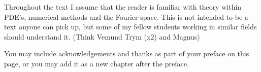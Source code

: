 
Throughout the text I assume that the reader is familiar with theory within PDE’s, numerical methods and the Fourier-space.
This is not intended to be a text anyone can pick up, but some of my fellow students working in similar fields should understand it. (Think Vemund Trym (x2) and Magnus)


\noindent You may include acknowledgements and thanks as part of your preface on this page, or you may add it as a new chapter after the preface.
